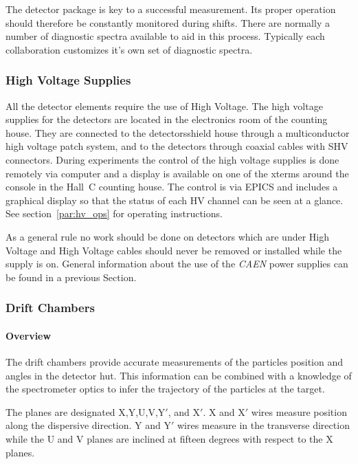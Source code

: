 The detector package is key to a successful measurement. Its
proper operation should therefore be constantly monitored during shifts. There
are normally a number of diagnostic spectra available to aid in this
process.  Typically each collaboration customizes it's own set of
diagnostic spectra.  

\subsubsection{High Voltage Supplies}

All the detector elements require the use of High Voltage. The
high voltage supplies for the detectors are located in the
electronics room of the counting house. They are connected to
the detectorsshield house through a multiconductor high voltage patch system,
and to the detectors through coaxial cables with SHV connectors.
During experiments the control of the high voltage supplies is
done remotely via computer and a display is available on one 
of the xterms around the console in the Hall~C counting house. The control is via
EPICS and includes a graphical display so that the status of each
HV channel can be seen at a glance. See section~\ref{par:hv_ops} for
operating instructions.

As a general rule no work should be done on detectors which are under
High Voltage and
High Voltage cables should never be removed or installed while the supply is on.
General information about the use of the {\em CAEN} power supplies can be
found in a previous Section.


\subsubsection{Drift Chambers}

\paragraph{Overview}

The drift chambers provide accurate measurements of the particles
position and angles in the detector hut. This information can be combined
with a knowledge of the spectrometer optics to infer the trajectory of the
particles at the target.

The planes are designated X,Y,U,V,Y$'$, and X$'$.
X and X$'$ wires measure position along the dispersive direction.
Y and Y$'$ wires measure in the transverse direction while
the U and V planes are inclined at fifteen degrees with respect to the
X planes.

